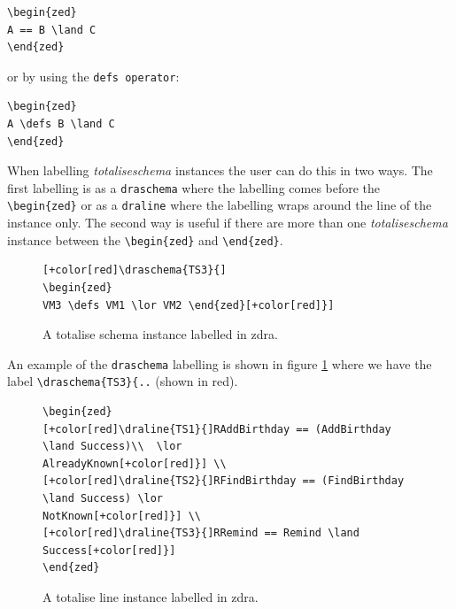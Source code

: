 \begin{verbatim}
\begin{zed}
A == B \land C
\end{zed}
\end{verbatim}

or by using the \verb|defs operator|:

\begin{verbatim}
\begin{zed}
A \defs B \land C
\end{zed}
\end{verbatim}

When labelling \emph{totaliseschema} instances the user can do this in two ways. The
first labelling is as a \verb|draschema| where the labelling comes before the
\verb|\begin{zed}| or as a \verb|draline| where the labelling wraps around the
line of the instance only. The second way is useful if there are more than one
\emph{totaliseschema} instance between the \verb|\begin{zed}| and \verb|\end{zed}|. 

\begin{figure}[H]
\centering
\begin{footnotesize}
\begin{BVerbatim}[commandchars=+\[\]]
[+color[red]\draschema{TS3}{]
\begin{zed}
VM3 \defs VM1 \lor VM2 \end{zed}[+color[red]}]
\end{BVerbatim}
\end{footnotesize}
\caption{\label{fig:exampleofts1} A totalise schema instance labelled in \gls{zdra}.}
\end{figure}

An example of the \verb|draschema| labelling is shown in figure
\ref{fig:exampleofts1} where we have the label \verb|\draschema{TS3}{..| (shown
in red).

\begin{figure}[H]
\centering
\begin{footnotesize}
\begin{BVerbatim}[commandchars=+\[\]]
\begin{zed} 
[+color[red]\draline{TS1}{]RAddBirthday == (AddBirthday \land Success)\\  \lor
AlreadyKnown[+color[red]}] \\
[+color[red]\draline{TS2}{]RFindBirthday == (FindBirthday \land Success) \lor
NotKnown[+color[red]}] \\
[+color[red]\draline{TS3}{]RRemind == Remind \land Success[+color[red]}]
\end{zed}
\end{BVerbatim}
\end{footnotesize}
\caption{\label{fig:exampleofts2} A totalise line instance labelled in \gls{zdra}.}
\end{figure}

